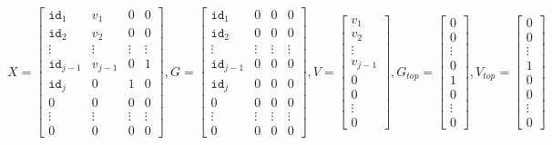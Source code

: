 \[
X = \begin{bmatrix}
    \texttt{id}_1 & v_1 & 0 & 0 \\
    \texttt{id}_2 & v_2 & 0 & 0 \\
    \vdots & \vdots & \vdots & \vdots \\
    \texttt{id}_{j-1} & v_{j-1} & 0 & 1 \\
    \texttt{id}_j & 0 & 1 & 0 \\
    0 & 0 & 0 & 0 \\
    \vdots & \vdots & \vdots & \vdots \\
     0 & 0 & 0 & 0
\end{bmatrix}, 
G = \begin{bmatrix}
    \texttt{id}_1 & 0 & 0 & 0 \\
    \texttt{id}_2 & 0 & 0 & 0\\
    \vdots & \vdots & \vdots & \vdots  \\
    \texttt{id}_{j-1} & 0 & 0 & 0\\
    \texttt{id}_j & 0 & 0 & 0\\
    0 & 0 & 0 & 0 \\
    \vdots & \vdots & \vdots & \vdots \\
     0 & 0 & 0 & 0
\end{bmatrix}, 
V = \begin{bmatrix}
    v_1  \\
    v_2 \\
    \vdots   \\
    v_{j-1} \\
    0 \\
    0 \\
    \vdots \\
     0 
\end{bmatrix}, 
G_{top} = \begin{bmatrix}
    0  \\
    0 \\
    \vdots   \\
    0 \\
    1 \\
    0 \\
    \vdots \\
     0 
\end{bmatrix}, 
V_{top} = \begin{bmatrix}
    0  \\
    0 \\
    \vdots   \\
    1 \\
    0 \\
    0 \\
    \vdots \\
     0 
\end{bmatrix}
\]

